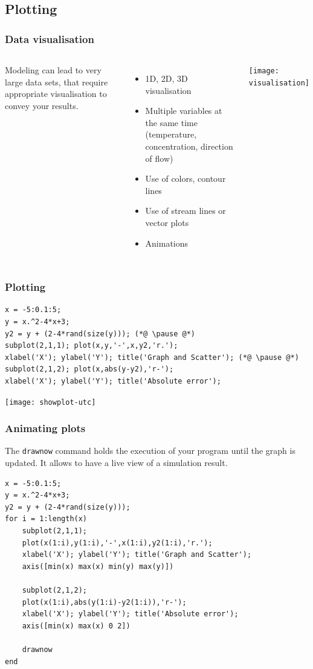 \subsection*{Plotting}
\begin{frame}
 \frametitle{Data visualisation}
 \begin{columns}
    Modeling can lead to very large data sets, that require appropriate visualisation to convey your results.
    \vspace*{2em}
    \begin{itemize}
      \item 1D, 2D, 3D visualisation
      \item Multiple variables at the same time (temperature, concentration, direction of flow)
      \item Use of colors, contour lines
      \item Use of stream lines or vector plots
      \item Animations
    \end{itemize}
   \centering\texttt{[image: visualisation]}
 \end{columns}
\end{frame}

\begin{frame}[fragile]
  \frametitle{Plotting}
  \begin{lstlisting}
x = -5:0.1:5;
y = x.^2-4*x+3;
y2 = y + (2-4*rand(size(y))); (*@ \pause @*)
subplot(2,1,1); plot(x,y,'-',x,y2,'r.');
xlabel('X'); ylabel('Y'); title('Graph and Scatter'); (*@ \pause @*)
subplot(2,1,2); plot(x,abs(y-y2),'r-');
xlabel('X'); ylabel('Y'); title('Absolute error');
  \end{lstlisting}
  \centering\texttt{[image: showplot-utc]}
\end{frame}

\begin{frame}[fragile]
  \frametitle{Animating plots}
  The \lstinline$drawnow$ command holds the execution of your program until the graph is updated. It allows to have a live view of a simulation result.
  \begin{lstlisting}
x = -5:0.1:5;
y = x.^2-4*x+3;
y2 = y + (2-4*rand(size(y)));
for i = 1:length(x)
    subplot(2,1,1); 
    plot(x(1:i),y(1:i),'-',x(1:i),y2(1:i),'r.');
    xlabel('X'); ylabel('Y'); title('Graph and Scatter');
    axis([min(x) max(x) min(y) max(y)])
    
    subplot(2,1,2); 
    plot(x(1:i),abs(y(1:i)-y2(1:i)),'r-');
    xlabel('X'); ylabel('Y'); title('Absolute error');
    axis([min(x) max(x) 0 2])

    drawnow
end
      \end{lstlisting}
\end{frame}

